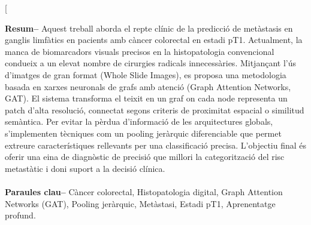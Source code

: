 ﻿\documentclass[10pt,a4paper,twocolumn,twoside]{article}
\begin{document}
\twocolumn[\begin{@twocolumnfalse}


\maketitle

\thispagestyle{primerapagina}
\begin{center}
\parbox{0.915\textwidth}
{\sffamily
\textbf{Resum--}
Aquest treball aborda el repte clínic de la predicció de metàstasis en ganglis limfàtics en pacients amb càncer colorectal en estadi pT1. Actualment, la manca de biomarcadors visuals precisos en la histopatologia convencional condueix a un elevat nombre de cirurgies radicals innecessàries. Mitjançant l'ús d'imatges de gran format (Whole Slide Images), es proposa una metodologia basada en xarxes neuronals de grafs amb atenció (Graph Attention Networks, GAT). El sistema transforma el teixit en un graf on cada node representa un patch d'alta resolució, connectat segons criteris de proximitat espacial o similitud semàntica. Per evitar la pèrdua d'informació de les arquitectures globals, s'implementen tècniques com un pooling jeràrquic diferenciable que permet extreure característiques rellevants per una classificació precisa. L'objectiu final és oferir una eina de diagnòstic de precisió que millori la categorització del risc metastàtic i doni suport a la decisió clínica.
\\
\\
\textbf{Paraules clau-- } Càncer colorectal, Histopatologia digital, Graph Attention Networks (GAT), Pooling jeràrquic, Metàstasi, Estadi pT1, Aprenentatge profund.\\
\\
\bigskip
\\
}
\end{center}
\end{@twocolumnfalse}
\end{document}
